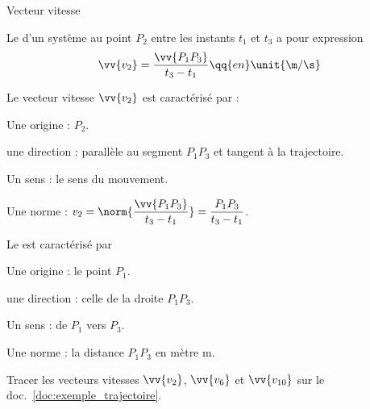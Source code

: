 \begin{doc}{Vecteur vitesse}
  \begin{importants}
    Le  d'un système au point $P_2$ entre les instants $t_1$ et $t_3$ a pour expression
    \begin{equation*}
      \vv{v_2} = \frac{\vv{P_1 P_3}}{t_3 - t_1} \qq{en} \unit{\m / \s}
    \end{equation*}
  \end{importants}
  
  Le vecteur vitesse $\vv{v_2}$ est caractérisé par :
  \begin{listePoints}[2]
    \item Une origine : $P_2$.
    \item une direction : parallèle au segment $P_1 P_3$ et tangent à la trajectoire.
    \item Un sens : le sens du mouvement.
    \item Une norme : $v_2 
    = \displaystyle \norm{\frac{\vv{P_1 P_3}}{t_3 - t_1}}
    = \displaystyle \frac{P_1 P_3}{t_3 - t_1}$.
  \end{listePoints}
  
  Le  est caractérisé par
  \begin{listePoints}[2]
    \item Une origine : le point $P_1$.
    \item une direction : celle de la droite $P_1 P_3$.
    \item Un sens : de $P_1$ vers $P_3$.
    \item Une norme : la distance $P_1 P_3$ en mètre \unit{m}.
  \end{listePoints}
\end{doc}

\mesure Tracer les vecteurs vitesses $\vv{v_2}$, $\vv{v_6}$ et $\vv{v_{10}}$ sur le doc.~\ref{doc:exemple_trajectoire}.
